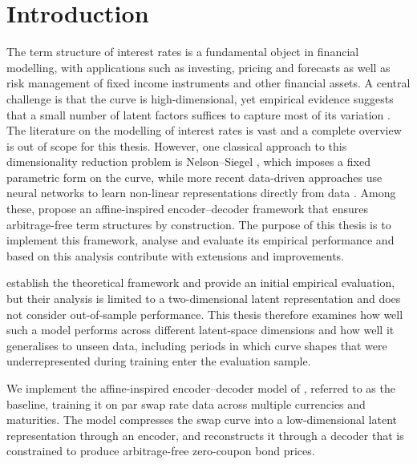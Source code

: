 \chapter{Introduction}
\label{chap:intro}

The term structure of interest rates is a fundamental object in financial modelling, with applications such as investing, pricing and forecasts as well as risk management of fixed income instruments and other financial assets. A central challenge is that the curve is high-dimensional, yet empirical evidence suggests that a small number of latent factors suffices to capture most of its variation \citep{Skovmand2025tsm}. The literature on the modelling of interest rates is vast and a complete overview is out of scope for this thesis. However, one classical approach to this dimensionality reduction problem is Nelson--Siegel \citep{NelsonSiegel1987}, which imposes a fixed parametric form on the curve, while more recent data-driven approaches use neural networks to learn non-linear representations directly from data \citep{Sokol2022, Andreasen2023, MatinWanPoulsen2025}. Among these, \citet{MatinWanPoulsen2025} propose an affine-inspired encoder--decoder framework that ensures arbitrage-free term structures by construction. The purpose of this thesis is to implement this framework, analyse and evaluate its empirical performance and based on this analysis contribute with extensions and improvements.


\citet{MatinWanPoulsen2025} establish the theoretical framework and provide an initial empirical evaluation, but their analysis is limited to a two-dimensional latent representation and does not consider out-of-sample performance. This thesis therefore examines how well such a model performs across different latent-space dimensions and how well it generalises to unseen data, including periods in which curve shapes that were underrepresented during training enter the evaluation sample.


We implement the affine-inspired encoder--decoder model of \citet{MatinWanPoulsen2025}, referred to as the baseline, training it on par swap rate data across multiple currencies and maturities. The model compresses the swap curve into a low-dimensional latent representation through an encoder, and reconstructs it through a decoder that is constrained to produce arbitrage-free zero-coupon bond prices.


